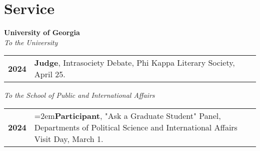\documentclass[letterpaper,12pt]{article}
\begin{document}
%

\section{Service}
\textbf{University of Georgia}\\
\textit{To the University}
\begin{xltabular}{\dimexpr\textwidth-0in}{p{.85in}X}
\textbf{2024} &  \textbf{Judge}, Intrasociety Debate, Phi Kappa Literary Society, April 25.
\end{xltabular}
\par
\textit{To the School of Public and International Affairs}
\begin{xltabular}{\dimexpr\textwidth-0in}{p{.85in}X}
\textbf{2024} &  \hangindent=2em\textbf{Participant}, "Ask a Graduate Student" Panel, Departments of Political Science and \mbox{International} Affairs Visit Day, March 1.
\end{xltabular}

\end{document}
